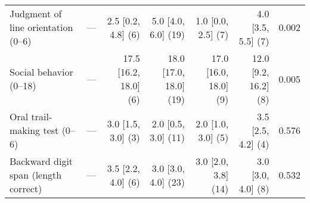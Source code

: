 \documentclass[]{article}
\begin{document}
\begin{table}[ht]
{\begin{tabular}{lrrrrrr}
  Judgment of line orientation (0--6) & --- &  2.5 [0.2, 4.8] (6) &  5.0 [4.0, 6.0] (19) &  1.0 [0.0, 2.5] (7) &  4.0 [3.5, 5.5] (7) &  0.002 \\ 
  Social behavior (0--18) & --- & 17.5 [16.2, 18.0] (6) & 18.0 [17.0, 18.0] (19) & 17.0 [16.0, 18.0] (9) & 12.0 [9.2, 16.2] (8) &  0.005 \\ 
  Oral trail-making test (0--6) & --- &  3.0 [1.5, 3.0] (3) &  2.0 [0.5, 3.0] (11) &  2.0 [1.0, 3.0] (5) &  3.5 [2.5, 4.2] (4) &  0.576 \\ 
  Backward digit span (length correct) & --- &  3.5 [2.2, 4.0] (6) &  3.0 [3.0, 4.0] (23) &  3.0 [2.0, 3.8] (14) &  3.0 [3.0, 4.0] (8) &  0.532 \\ 
   \hline
\end{tabular}
}
\end{table}
\end{document}
